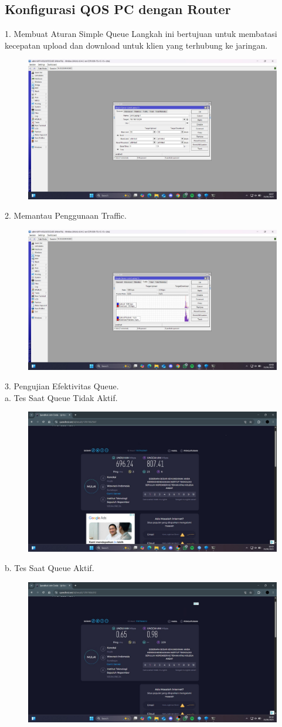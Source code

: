 \subsection{Konfigurasi QOS PC dengan Router}
1. Membuat Aturan Simple Queue Langkah ini bertujuan untuk membatasi kecepatan upload dan download untuk klien yang terhubung ke jaringan. 
\begin{figure}[H]
    \centering
    \includegraphics[width=0.65\linewidth]{image/tun12.jpg}
    \label{fig:inirujukan}
\end{figure}
2. Memantau Penggunaan Traffic.
\begin{figure}[H]
    \centering
    \includegraphics[width=0.65\linewidth]{image/tun13.jpg}
    \label{fig:inirujukan}
\end{figure}
3. Pengujian Efektivitas Queue. \\
a. Tes Saat Queue Tidak Aktif.
\begin{figure}[H]
    \centering
    \includegraphics[width=0.65\linewidth]{image/tun14.jpg}
    \label{fig:inirujukan}
\end{figure}
b. Tes Saat Queue Aktif.
\begin{figure}[H]
    \centering
    \includegraphics[width=0.65\linewidth]{image/tun15.jpg}
    \label{fig:inirujukan}
\end{figure}

